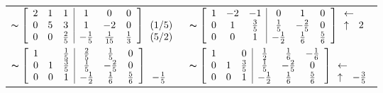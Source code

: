 \documentclass[11pt]{amsbook}
\begin{document}
\begin{tabular}{ll}
$\thicksim\left[\begin{array}{ccc|ccc}
2 & 1 & 1  & 1 & 0 & 0 \\
0 & 5 & 3 & 1 & -2 & 0 \\
0 & 0 & \frac{2}{5} & -\frac{1}{5} & \frac{1}{15} & \frac{1}{3}
\end{array}\right]
\begin{array}{c} \\ (1/5) \\ (5/2) \\\end{array}$
&
$\thicksim\left[\begin{array}{ccc|ccc}
1 & -2 & -1  & 0 & 1 & 0 \\
0 & 1 & \frac{3}{5} & \frac{1}{5} & -\frac{2}{5} & 0 \\
0 & 0 & 1 & -\frac{1}{2} & \frac{1}{6} & \frac{5}{6}
\end{array}\right]
\begin{array}{cc} 
\multicolumn{2}{l}{\leftarrow} \\ 
\uparrow & 2 \\ \\\end{array}$

\\

$\thicksim\left[\begin{array}{ccc|ccc}
1 &  & \frac{1}{5}  & \frac{2}{5} & \frac{1}{5} & 0 \\
0 & 1 & \frac{3}{5} & \frac{1}{5} & -\frac{2}{5} & 0 \\
0 & 0 & 1 & -\frac{1}{2} & \frac{1}{6} & \frac{5}{6}
\end{array}\right]
\begin{array}{c}\\ \\ -\frac{1}{5}\\\end{array}$
&
$\thicksim\left[\begin{array}{ccc|ccc}
1 &  & 0  & \frac{1}{2} & \frac{1}{6} & -\frac{1}{6} \\
0 & 1 & \frac{3}{5} & \frac{1}{5} & -\frac{2}{5} & 0 \\
0 & 0 & 1 & -\frac{1}{2} & \frac{1}{6} & \frac{5}{6}
\end{array}\right]
\begin{array}{cc} 
\\ 
\multicolumn{2}{l}{\leftarrow} \\ 
\uparrow & -\frac{3}{5} \\\end{array}$


\end{tabular}
\end{document}
